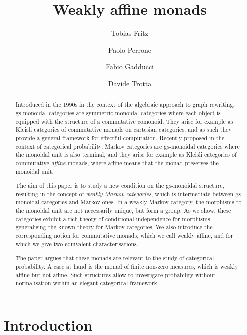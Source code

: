 \documentclass[a4paper,UKenglish,numberwithinsect,cleveref, autoref, thm-restate]{lipics-v2021}
\title{Weakly affine monads}
\author{Tobias Fritz}{Department of Mathematics, University of Innsbruck, AT}{tobias.fritz@uibk.ac.at}{}{}
\author{Paolo Perrone}{Department of Computer Science, University of Oxford, UK}{paolo.perrone@cs.ox.ac.uk}{https://orcid.org/0000-0002-9123-9089}{}
\author{Fabio Gadducci}{Department of Computer Science, University of Pisa, Pisa, IT}{fabio.gadducci@unipi.it}{https://orcid.org/
0000-0003-0690-3051}{MIUR PRIN 2017FTXR ``IT-MaTTerS''.}
\author{ Davide Trotta }{Department of Computer Science, University of Pisa, Pisa, IT}{trottadavide92@gmail.com}{https://orcid.org/0000-0003-4509-594X}{MIUR PRIN 2017FTXR ``IT-MaTTerS''.}
\theoremstyle{plain} %
\theoremstyle{definition} %
\begin{document}
\maketitle

\begin{abstract}
   Introduced in the 1990s in the context of the algebraic approach to graph rewriting, 
   gs-monoidal categories are symmetric monoidal categories 
   where each object is equipped with the structure of a commutative comonoid. They arise for example as 
   Kleisli categories of commutative monads on cartesian categories, 
   and as such they provide a general framework for effectful computation. 
   Recently proposed in the context of categorical probability, Markov categories are
   gs-monoidal categories where the monoidal unit is also terminal, and they arise for example as
   Kleisli categories of commutative \emph{affine} monads, where affine means that the monad preserves the monoidal unit.

   The aim of this paper is to study a new condition on the gs-monoidal structure, resulting in the concept of \emph{weakly Markov categories},
   which is intermediate between gs-monoidal categories and Markov ones. 
   In a weakly Markov category, the morphisms to the monoidal unit are not necessarily unique, but form a group.
   As we show, these categories exhibit a rich theory of conditional independence for morphisms, generalising the known theory for Markov categories. 
   We also introduce the corresponding notion for commutative monads, which we call weakly affine, and for which we give two equivalent
   characterisations.

   The paper argues that these monads are relevant to the study of categorical probability.
   A case at hand is the monad of finite non-zero measures, which is weakly affine but not affine. 
   Such structures allow to investigate probability without normalisation within an elegant categorical framework.
\end{abstract}

\section{Introduction}
\end{document}
